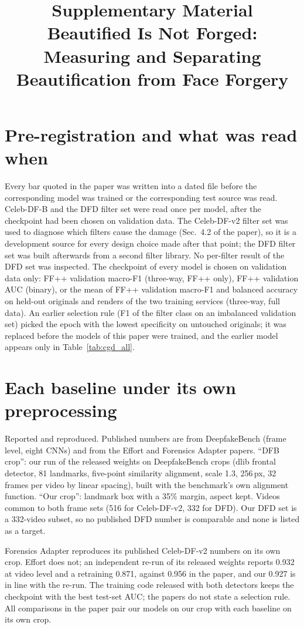 \documentclass[10pt]{article}
\title{Supplementary Material\\Beautified Is Not Forged: Measuring and Separating Beautification from Face Forgery}
\author{}\date{}
\begin{document}
\maketitle

\section{Pre-registration and what was read when}
Every bar quoted in the paper was written into a dated file before the corresponding model was trained or the
corresponding test source was read. Celeb-DF-B and the DFD filter set were read once per model, after the checkpoint had
been chosen on validation data. The Celeb-DF-v2 filter set was used to diagnose which filters cause the damage
(Sec.~4.2 of the paper), so it is a development source for every design choice made after that point; the DFD filter set
was built afterwards from a second filter library. No per-filter result of the DFD set was inspected. The checkpoint of
every model is chosen on validation data only: FF++ validation macro-F1 (three-way, FF++ only), FF++ validation AUC
(binary), or the mean of FF++ validation macro-F1 and balanced accuracy on held-out originals and renders of the two
training services (three-way, full data). An earlier selection rule (F1 of the filter class on an imbalanced validation
set) picked the epoch with the lowest specificity on untouched originals; it was replaced before the models of this paper
were trained, and the earlier model appears only in Table~\ref{tab:cgd_all}.

\section{Each baseline under its own preprocessing}
\begin{table}[h]
\centering
\caption{Reported and reproduced. Published numbers are from DeepfakeBench (frame level, eight CNNs) and from the Effort
and Forensics Adapter papers. ``DFB crop'': our run of the released weights on DeepfakeBench crops (dlib frontal
detector, 81 landmarks, five-point similarity alignment, scale 1.3, 256\,px, 32 frames per video by linear spacing), built
with the benchmark's own alignment function. ``Our crop'': landmark box with a 35\% margin, aspect kept. Videos common to
both frame sets (516 for Celeb-DF-v2, 332 for DFD). Our DFD set is a 332-video subset, so no published DFD number is
comparable and none is listed as a target.}
\label{tab:reproduce}
\footnotesize
\begin{adjustbox}{max width=\linewidth}\end{adjustbox}
\end{table}
Forensics Adapter reproduces its published Celeb-DF-v2 numbers on its own crop. Effort does not; an independent re-run
of its released weights reports 0.932 at video level and a retraining 0.871, against 0.956 in the paper, and our 0.927 is
in line with the re-run. The training code released with both detectors keeps the checkpoint with the best test-set AUC;
the papers do not state a selection rule. All comparisons in the paper pair our models on our crop with each baseline on
its own crop.
\end{document}
